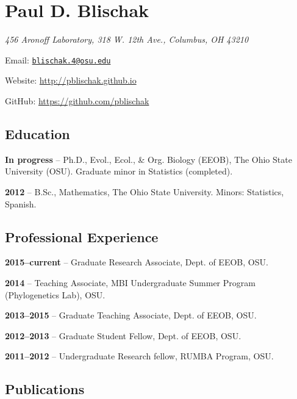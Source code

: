 \documentclass[]{article}
\title{}
\author{}
\date{}
\begin{document}
\maketitle


\section{\texorpdfstring{\textbf{Paul D.
Blischak}}{Paul D. Blischak}}\label{paul-d.-blischak}

\emph{456 Aronoff Laboratory, 318 W. 12th Ave., Columbus, OH 43210}

Email: \href{mailto:blischak.4@osu.edu}{\nolinkurl{blischak.4@osu.edu}}

Website:
\href{http://pblischak.github.io}{\url{http://pblischak.github.io}}

GitHub:
\href{https://github.com/pblischak}{\url{https://github.com/pblischak}}

\subsection{\texorpdfstring{\textbf{Education}}{Education}}\label{education}

\textbf{In progress} -- Ph.D., Evol., Ecol., \& Org. Biology (EEOB), The
Ohio State University (OSU). Graduate minor in Statistics (completed).

\textbf{2012} -- B.Sc., Mathematics, The Ohio State University. Minors:
Statistics, Spanish.

\subsection{\texorpdfstring{\textbf{Professional
Experience}}{Professional Experience}}\label{professional-experience}

\textbf{2015--current} -- Graduate Research Associate, Dept. of EEOB,
OSU.

\textbf{2014} -- Teaching Associate, MBI Undergraduate Summer Program
(Phylogenetics Lab), OSU.

\textbf{2013--2015} -- Graduate Teaching Associate, Dept. of EEOB, OSU.

\textbf{2012--2013} -- Graduate Student Fellow, Dept. of EEOB, OSU.

\textbf{2011--2012} -- Undergraduate Research fellow, RUMBA Program,
OSU.

\subsection{\texorpdfstring{\textbf{Publications}}{Publications}}\label{publications}
\end{document}
